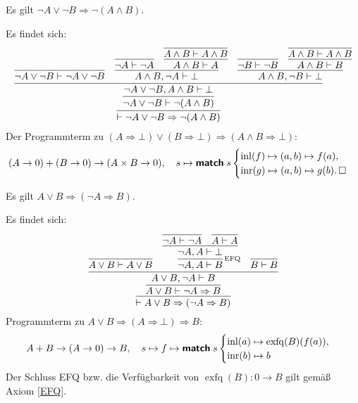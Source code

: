 \begin{Satz}
Es gilt $\neg A\lor\neg B\Rightarrow\neg (A\land B)$.
\end{Satz}
\begin{Beweis}
Es findet sich:
\[
\infer{\vdash\neg A\lor\neg B\Rightarrow\neg (A\land B)}{
  \infer{\neg A\lor\neg B\vdash\neg (A\land B)}{
    \infer{\neg A\lor\neg B, A\land B\vdash\bot}{
      \infer{\neg A\lor\neg B\vdash\neg A\lor\neg B}{}
    & \infer{A\land B,\neg A\vdash\bot}{
        \infer{\neg A\vdash\neg A}{}
      & \infer{A\land B\vdash A}{\infer{A\land B\vdash A\land B}{}}}
    & \infer{A\land B,\neg B\vdash\bot}{
        \infer{\neg B\vdash\neg B}{}
      & \infer{A\land B\vdash B}{\infer{A\land B\vdash A\land B}{}}}}}}
\]
Der Programmterm zu
$(A\Rightarrow\bot)\lor(B\Rightarrow\bot)\Rightarrow (A\land B\Rightarrow\bot)$:
\[(A\to 0)+(B\to 0)\to (A\times B\to 0),\quad
s\mapsto\text{{\normalfont\sffamily\bfseries match}}\; s\begin{cases}
\operatorname{inl}(f)\mapsto (a,b)\mapsto f(a),\\
\operatorname{inr}(g)\mapsto (a,b)\mapsto g(b).\,\square
\end{cases}\]
\end{Beweis}

\begin{Satz}
Es gilt $A\lor B\Rightarrow (\neg A\Rightarrow B)$.
\end{Satz}
\begin{Beweis}
Es findet sich:
\[
\infer{\vdash A\lor B\Rightarrow (\neg A\Rightarrow B)}{
  \infer{A\lor B\vdash \neg A\Rightarrow B}{
    \infer{A\lor B, \neg A\vdash B}{
      \infer{A\lor B\vdash A\lor B}{}
    & \infer[\infernote{EFQ}]{\neg A, A\vdash B}{
        \infer{\neg A, A\vdash\bot}{
          \infer{\neg A\vdash\neg A}{}
        & \infer{A\vdash A}{}}}
    & \infer{B\vdash B}{}}}}
\]
Programmterm zu $A\lor B\Rightarrow (A\Rightarrow\bot)\Rightarrow B$:
\[A+B\to (A\to 0)\to B,\quad s\mapsto f\mapsto\text{{\normalfont\sffamily\bfseries match}}\; s\begin{cases}
\operatorname{inl}(a)\mapsto \operatorname{exfq}(B)(f(a)),\\
\operatorname{inr}(b)\mapsto b
\end{cases}\]
Der Schluss EFQ bzw. die Verfügbarkeit von
$\operatorname{exfq}(B)\colon 0\to B$
gilt gemäß Axiom \ref{EFQ}.\,\qedsymbol
\end{Beweis}

